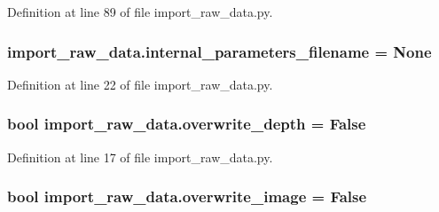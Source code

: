 Definition at line 89 of file import\+\_\+raw\+\_\+data.\+py.

\subsubsection[{\texorpdfstring{internal\+\_\+parameters\+\_\+filename}{internal_parameters_filename}}]{\setlength{\rightskip}{0pt plus 5cm}import\+\_\+raw\+\_\+data.\+internal\+\_\+parameters\+\_\+filename = None}\hypertarget{namespaceimport__raw__data_a3dfcf1d349b305dd0e6266949cbdf1d9}{}\label{namespaceimport__raw__data_a3dfcf1d349b305dd0e6266949cbdf1d9}


Definition at line 22 of file import\+\_\+raw\+\_\+data.\+py.

\subsubsection[{\texorpdfstring{overwrite\+\_\+depth}{overwrite_depth}}]{\setlength{\rightskip}{0pt plus 5cm}bool import\+\_\+raw\+\_\+data.\+overwrite\+\_\+depth = False}\hypertarget{namespaceimport__raw__data_acc001998ec495e68c97a1c5ce440c0b5}{}\label{namespaceimport__raw__data_acc001998ec495e68c97a1c5ce440c0b5}


Definition at line 17 of file import\+\_\+raw\+\_\+data.\+py.

\subsubsection[{\texorpdfstring{overwrite\+\_\+image}{overwrite_image}}]{\setlength{\rightskip}{0pt plus 5cm}bool import\+\_\+raw\+\_\+data.\+overwrite\+\_\+image = False}\hypertarget{namespaceimport__raw__data_aed53f41d71fa76451085c8cb38c369d3}{}\label{namespaceimport__raw__data_aed53f41d71fa76451085c8cb38c369d3}


